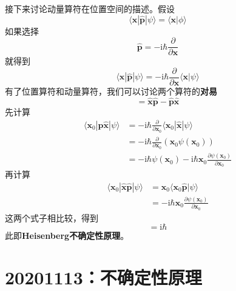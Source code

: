 \documentclass[12pt]{article}
\begin{document}
    接下来讨论动量算符在位置空间的描述。假设
    \begin{equation}
        \langle \bm{x} |\hat{\bm{p}} | \psi \rangle
        = \langle \bm{x} | \phi \rangle
    \end{equation}
    如果选择
    \begin{equation}
        \hat{\bm{p}} = -\mathrm{i}\hbar \frac {\partial }{\partial \bm{x}}
    \end{equation}
    就得到
    \begin{equation}
        \langle \bm{x} |\hat{\bm{p}} | \psi \rangle = -\mathrm{i}\hbar \frac {\partial }{\partial \bm{x}}\langle \bm{x} | \psi \rangle
    \end{equation}
    有了位置算符和动量算符，我们可以讨论两个算符的\textbf{对易}
    \begin{equation}
        [\hat{\bm{x}},\hat{\bm{p}}] = \hat{\bm{x}}\hat{\bm{p}} - \hat{\bm{p}}\hat{\bm{x}}
    \end{equation}
    先计算
    \begin{equation}\begin{aligned}
        \langle \bm{x}_0 |\hat{\bm{p}}\hat{\bm{x}} | \psi \rangle &= -\mathrm{i}\hbar \frac {\partial}{\partial \bm{x}_0} \langle \bm{x}_0 |\hat{\bm{x}} | \psi \rangle\\
        &= -\mathrm{i}\hbar \frac {\partial}{\partial \bm{x}_0} (\bm{x}_0\psi(\bm{x}_0))\\
        &= -\mathrm{i}\hbar \psi(\bm{x}_0) - \mathrm{i}\hbar \bm{x}_0 \frac {\partial \psi(\bm{x}_0)}{\partial \bm{x}_0}
    \end{aligned}\end{equation}
    再计算
    \begin{equation}\begin{aligned}
        \langle \bm{x}_0 |\hat{\bm{x}} \hat{\bm{p}} | \psi \rangle &= \bm{x}_0 \langle \bm{x}_0 \hat{\bm{p}} | \psi \rangle\\
        &= -\mathrm{i}\hbar \bm{x}_0 \frac {\partial \psi(\bm{x}_0)}{\partial \bm{x}_0}
    \end{aligned}\end{equation}
    这两个式子相比较，得到
    \begin{equation}
        [\hat{\bm{x}},\hat{\bm{p}}] = \mathrm{i}\hbar
    \end{equation}
    此即\textbf{Heisenberg不确定性原理}。

\section{20201113：不确定性原理}
\end{document}
